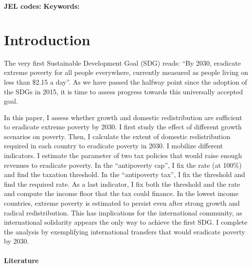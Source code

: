 
\begin{abstract}

\end{abstract}

\textbf{JEL codes:} 
\textbf{Keywords:} 

\tableofcontents

\onehalfspacing %


\section{Introduction}%

The very first Sustainable Development Goal (SDG) reads: ``By 2030, eradicate extreme poverty for all people everywhere, currently measured as people living on less than \$2.15 a day''. As we have passed the halfway point since the adoption of the SDGs in 2015, it is time to assess progress towards this universally accepted goal. 

In this paper, I assess whether growth and domestic redistribution are sufficient to eradicate extreme poverty by 2030. I first study the effect of different growth scenarios on poverty. Then, I calculate the extent of domestic redistribution required in each country to eradicate poverty in 2030. I mobilize different indicators. I estimate the parameter of two tax policies that would raise enough revenues to eradicate poverty. In the ``antipoverty cap'', I fix the rate (at 100\%) and find the taxation threshold. In the ``antipoverty tax'', I fix the threshold and find the required rate. As a last indicator, I fix both the threshold and the rate and compute the income floor that the tax could finance. In the lowest income countries, extreme poverty is estimated to persist even after strong growth and radical redistribution. %
This has implications for the international community, as international solidarity appears the only way to achieve the first SDG. I complete the analysis by exemplifying international transfers that would eradicate poverty by 2030.

\paragraph{Literature} 

